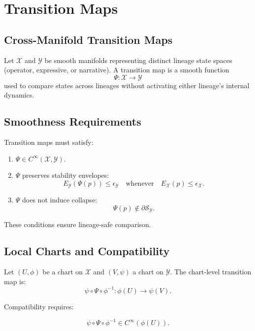
\section{Transition Maps}
\label{sec:transition-maps}

\subsection{Cross-Manifold Transition Maps}

Let $\mathcal{X}$ and $\mathcal{Y}$ be smooth manifolds representing distinct
lineage state spaces (operator, expressive, or narrative). A transition map is a
smooth function
\[
\Psi : \mathcal{X} \rightarrow \mathcal{Y}
\]
used to compare states across lineages without activating either lineage’s
internal dynamics.

\subsection{Smoothness Requirements}

Transition maps must satisfy:

\begin{enumerate}
    \item $\Psi \in C^\infty(\mathcal{X}, \mathcal{Y})$.
    \item $\Psi$ preserves stability envelopes:
    \[
    E_{\mathcal{Y}}(\Psi(p)) \le \epsilon_{\mathcal{Y}}
    \quad \text{whenever} \quad
    E_{\mathcal{X}}(p) \le \epsilon_{\mathcal{X}}.
    \]
    \item $\Psi$ does not induce collapse:
    \[
    \Psi(p) \notin \partial \mathcal{S}_{\mathcal{Y}}.
    \]
\end{enumerate}

These conditions ensure lineage-safe comparison.

\subsection{Local Charts and Compatibility}

Let $(U, \phi)$ be a chart on $\mathcal{X}$ and $(V, \psi)$ a chart on
$\mathcal{Y}$. The chart-level transition map is:
\[
\psi \circ \Psi \circ \phi^{-1} : \phi(U) \rightarrow \psi(V).
\]

Compatibility requires:

\[
\psi \circ \Psi \circ \phi^{-1} \in C^\infty(\phi(U)).
\]

